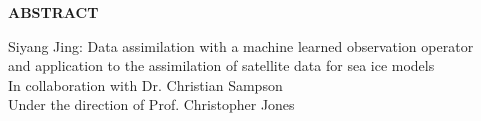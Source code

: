 
\begin{center}
\vspace*{52pt}
{\Large \textbf{ABSTRACT}}
\vspace{11pt}

\begin{singlespace}
Siyang Jing: Data assimilation with a machine learned observation operator \\
and application to the assimilation of satellite data for sea ice models\\
In collaboration with Dr. Christian Sampson\\
Under the direction of Prof. Christopher Jones
\end{singlespace}
\end{center}

